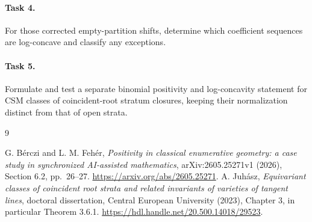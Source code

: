 \documentclass[11pt]{article}
\begin{document}
\paragraph{Task 4.}
For those corrected empty-partition shifts, determine which coefficient
sequences are log-concave and classify any exceptions.

\paragraph{Task 5.}
Formulate and test a separate binomial positivity and log-concavity
statement for CSM classes of coincident-root stratum closures, keeping
their normalization distinct from that of open strata.

\begin{thebibliography}{9}
\raggedright
{}
G. B\'erczi and L. M. Feh\'er,
\emph{Positivity in classical enumerative geometry: a case study in
synchronized AI-assisted mathematics}, arXiv:2605.25271v1 (2026),
Section 6.2, pp.~26--27.
\url{https://arxiv.org/abs/2605.25271}.
A. Juh\'asz, \emph{Equivariant classes of coincident root strata and
related invariants of varieties of tangent lines},
doctoral dissertation, Central European University (2023),
Chapter 3, in particular Theorem 3.6.1.
\url{https://hdl.handle.net/20.500.14018/29523}.
\end{thebibliography}
\end{document}
